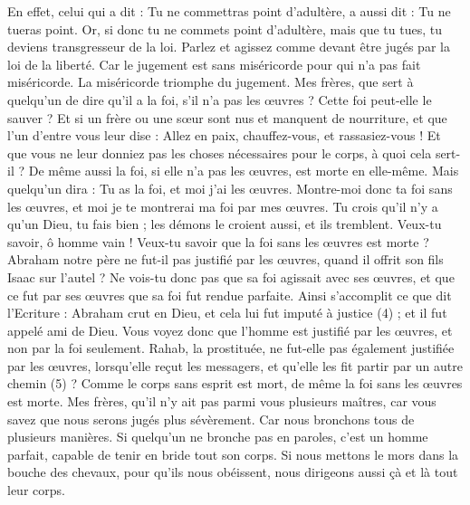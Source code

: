 \begin{multicols}{2}
En effet, celui qui a dit : Tu ne commettras point d’adultère, a aussi dit : Tu ne tueras point. Or, si donc tu ne commets point d’adultère{}, mais que tu tues, tu deviens transgresseur de la loi.
Parlez et agissez comme devant être jugés par la loi de la liberté.
Car le jugement est sans miséricorde pour qui n’a pas fait miséricorde{}. La miséricorde triomphe du jugement.
Mes frères, que sert à quelqu'un de dire qu'il a la foi, s’il n’a pas les œuvres ? Cette foi peut-elle le sauver ?
Et si un frère ou une sœur sont nus et manquent de nourriture,
et que l’un d'entre vous leur dise : Allez en paix, chauffez-vous, et rassasiez-vous ! Et que vous ne leur donniez pas les choses nécessaires pour le corps, à quoi cela sert-il ?
De même aussi la foi, si elle n'a pas les œuvres, est morte en elle-même.
Mais quelqu'un dira : Tu as la foi, et moi j'ai les œuvres. Montre-moi donc ta foi sans les œuvres, et moi je te montrerai ma foi par mes œuvres.
Tu crois qu'il n'y a qu'un Dieu, tu fais bien ; les démons le croient aussi, et ils tremblent.
Veux-tu savoir, ô homme vain ! Veux-tu savoir que la foi sans les œuvres est morte ?
Abraham notre père ne fut-il pas justifié par les œuvres, quand il offrit son fils Isaac sur l'autel ?
Ne vois-tu donc pas que sa foi agissait avec ses œuvres, et que ce fut par ses œuvres que sa foi fut rendue parfaite.
Ainsi s’accomplit ce que dit l’Ecriture : Abraham crut en Dieu, et cela lui fut imputé à justice{} (4) ; et il fut appelé ami de Dieu.
Vous voyez donc que l'homme est justifié par les œuvres, et non par la foi seulement.
Rahab, la prostituée, ne fut-elle pas également justifiée par les œuvres, lorsqu’elle reçut les messagers, et qu'elle les fit partir par un autre chemin{} (5) ?
Comme le corps sans esprit est mort, de même la foi sans les œuvres est morte.
\VerseOne{}Mes frères, qu’il n’y ait pas parmi vous plusieurs maîtres{}, car vous savez que nous serons jugés plus sévèrement.
Car nous bronchons tous de plusieurs manières. Si quelqu'un ne bronche pas en paroles, c’est un homme parfait, capable de tenir en bride tout son corps.
Si nous mettons le mors dans la bouche des chevaux, pour qu'ils nous obéissent, nous dirigeons aussi çà et là tout leur corps.

\end{multicols}
